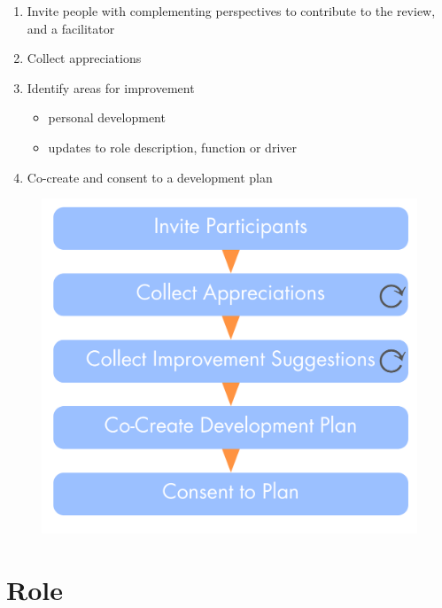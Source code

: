 \begin{enumerate}
\item Invite people with complementing perspectives to contribute to the review, and a facilitator

\item Collect appreciations

\item Identify areas for improvement

\begin{itemize}
\item personal development

\item updates to role description, function or driver

\end{itemize}

\item Co-create and consent to a development plan

\end{enumerate}

\begin{figure}[htbp]
\centering
\includegraphics[keepaspectratio,width=\textwidth,height=0.75\textheight]{img/people-and-roles/effectiveness-review.png}
\end{figure}

\section{Role}
\label{role}

